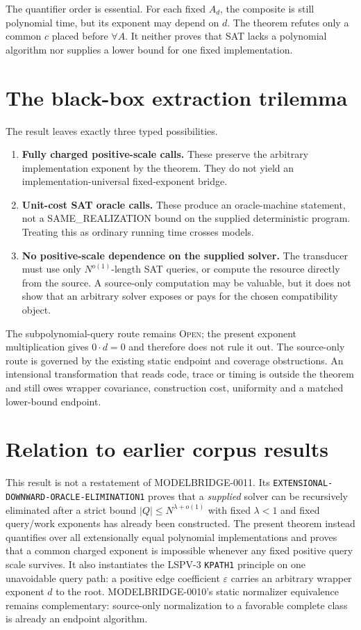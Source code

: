 \documentclass[11pt]{article}
\newcommand{\status}[1]{\textsc{#1}}
\begin{document}
The quantifier order is essential.  For each fixed $A_d$, the composite is
still polynomial time, but its exponent may depend on $d$.  The theorem
refutes only a common $c$ placed before $\forall A$.  It neither proves that
SAT lacks a polynomial algorithm nor supplies a lower bound for one fixed
implementation.

\section{The black-box extraction trilemma}

The result leaves exactly three typed possibilities.
\begin{enumerate}[leftmargin=1.5em]
\item \textbf{Fully charged positive-scale calls.}  These preserve the
      arbitrary implementation exponent by the theorem.  They do not yield
      an implementation-universal fixed-exponent bridge.
\item \textbf{Unit-cost SAT oracle calls.}  These produce an oracle-machine
      statement, not a SAME\_REALIZATION bound on the supplied deterministic
      program.  Treating this as ordinary running time crosses models.
\item \textbf{No positive-scale dependence on the supplied solver.}  The
      transducer must use only $N^{o(1)}$-length SAT queries, or compute the
      resource directly from the source.  A source-only computation may be
      valuable, but it does not show that an arbitrary solver exposes or pays
      for the chosen compatibility object.
\end{enumerate}
The subpolynomial-query route remains \status{Open}; the present exponent
multiplication gives $0\cdot d=0$ and therefore does not rule it out.  The
source-only route is governed by the existing static endpoint and coverage
obstructions.  An intensional transformation that reads code, trace or timing
is outside the theorem and still owes wrapper covariance, construction cost,
uniformity and a matched lower-bound endpoint.

\section{Relation to earlier corpus results}

This result is not a restatement of MODELBRIDGE-0011.  Its
\texttt{EXTENSIONAL-DOWNWARD-ORACLE-ELIMINATION1} proves that a \emph{supplied}
solver can be recursively eliminated after a strict bound
$|Q|\le N^{\lambda+o(1)}$ with fixed $\lambda<1$ and fixed query/work
exponents has already been constructed.  The present theorem instead
quantifies over all extensionally equal polynomial implementations and proves
that a common charged exponent is impossible whenever any fixed positive
query scale survives.  It also instantiates the LSPV-3
\texttt{KPATH1} principle on one unavoidable query path: a positive edge
coefficient $\varepsilon$ carries an arbitrary wrapper exponent $d$ to the
root.  MODELBRIDGE-0010's static normalizer equivalence remains complementary:
source-only normalization to a favorable complete class is already an
endpoint algorithm.
\end{document}
